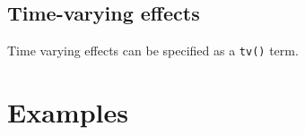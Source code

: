 \documentclass[12pt]{article}
\begin{document}
\subsection{Time-varying effects}
Time varying effects can be specified as a \texttt{tv()} term.

\section{Examples}


\begin{singlespace}

\scriptsize

\end{singlespace}
\end{document}
